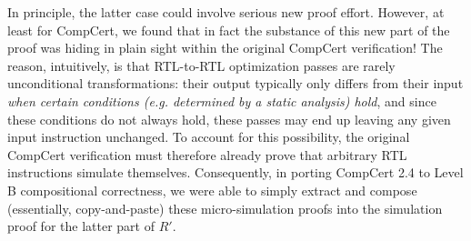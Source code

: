 In principle, the latter case could involve serious new proof effort.
However, at least for CompCert, we found that in fact the substance of
this new part of the proof was hiding in plain sight within the
original CompCert verification!  The reason, intuitively, is that
RTL-to-RTL optimization passes are rarely unconditional
transformations: their output typically only differs from their input
\emph{when certain conditions (e.g. determined by a static analysis)
  hold}, and since these conditions do not always hold, these passes
may end up leaving any given input instruction unchanged.  To account
for this possibility, the original CompCert verification must
therefore already prove that arbitrary RTL instructions simulate
themselves.  Consequently, in porting CompCert 2.4 to Level B
compositional correctness, we were able to simply extract and compose
(essentially, copy-and-paste) these micro-simulation proofs into the
simulation proof for the latter part of $R'$.












